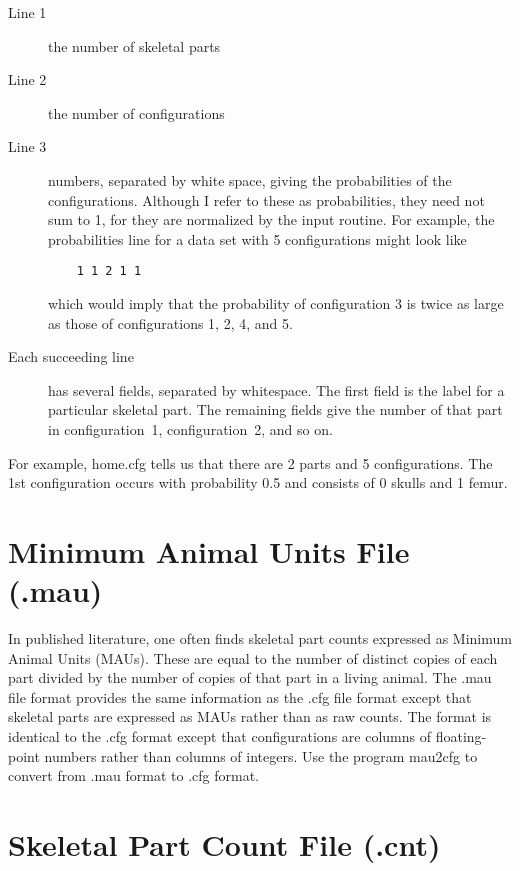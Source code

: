 \begin{description}
\item[Line 1]
the number of skeletal parts

\item[Line 2]
the number of configurations

\item[Line 3]
numbers, separated by white space, giving the probabilities of the
configurations.  Although I refer to these as probabilities, they need
not sum to 1, for they are normalized by the input routine.  For
example, the probabilities line for a data set with 5 configurations
might look like 
\begin{verbatim}
    1 1 2 1 1
\end{verbatim}
which would imply that the probability of configuration 3 is twice as
large as those of configurations 1, 2, 4, and 5.

\item[Each succeeding line]
has several fields, separated by whitespace.  The first field is the
label for a particular skeletal part.  The remaining fields give the
number of that part in configuration~1, configuration~2, and so on.
\end{description}

For example, home.cfg tells us that there are 2 parts and 5
configurations.  The 1st configuration occurs with probability 0.5 and
consists of 0 skulls and 1 femur.

\section{Minimum Animal Units File (.mau)\label{sec.mau}}%

In published literature, one often finds skeletal part counts
expressed as Minimum Animal Units (MAUs).  These are equal to the
number of distinct copies of each part divided by the number of copies
of that part in a living animal.  The .mau file format provides the
same information as the .cfg file format except that skeletal parts
are expressed as MAUs rather than as raw counts.  The format is
identical to the .cfg format except that configurations are columns of
floating-point numbers rather than columns of integers.  Use the
program mau2cfg to convert from .mau format to .cfg format.

\section{Skeletal Part Count File (.cnt)\label{sec.cnt}}%

